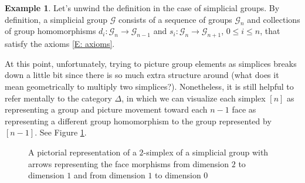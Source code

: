 \documentclass[12pt]{article}
\theoremstyle{plain}
\theoremstyle{definition}
\newtheorem{example}[theorem]{Example}
\newcommand{\mc}[1]{\mathcal{#1}}
\begin{document}
\begin{example}
Let's unwind the definition in the case of simplicial groups. By definition, a simplicial group $\mc G$ consists of a sequence of groups $\mc G_n$ and collections of group homomorphisms $d_i\colon\mc G_n\to \mc G_{n-1}$ and $s_i\colon\mc G_n\to\mc G_{n+1}$, $0\leq i\leq n$, that satisfy the axioms \eqref{E: axioms}.

At this point, unfortunately, trying to picture group elements as simplices breaks down a little bit since there is so much extra structure around (what does it mean geometrically to multiply two simplices?). Nonetheless, it is still helpful to refer mentally to the category $\Delta$, in which we can visualize each simplex $[n]$ as representing  a group and picture movement toward each $n-1$ face as representing a different group homomorphism to the group represented by $[n-1]$. See Figure \ref{F: fig17}.
\end{example}

\begin{figure}[!htp]
\begin{center}
\end{center}
\caption{A pictorial representation of a $2$-simplex of a simplicial group with arrows representing the face morphisms from dimension $2$ to dimension $1$ and from dimension $1$ to dimension $0$}\label{F: fig17}
\end{figure}
\end{document}
